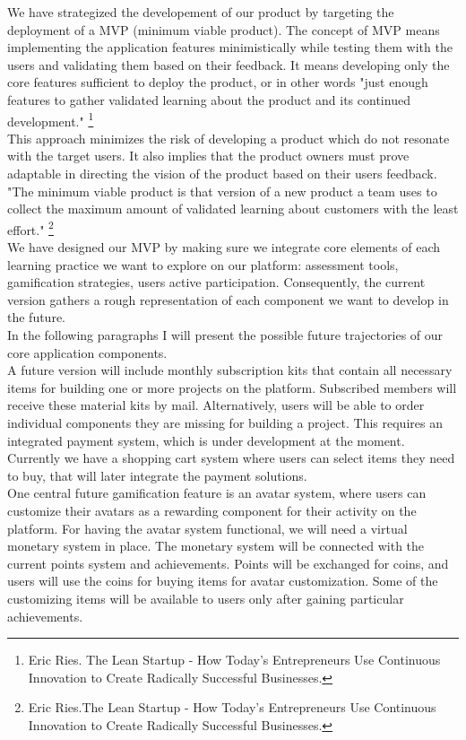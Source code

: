 We have strategized the developement of our product by targeting the deployment of a MVP (minimum viable product). The concept of MVP means implementing the application features minimistically while testing them with the users and validating them based on their feedback. It means developing only the core features sufficient to deploy the product, or in other words "just enough features to gather validated learning about the product and its continued development." \cite{leanstartup}\footnote{Eric Ries. The Lean Startup - How Today's Entrepreneurs Use Continuous Innovation to Create Radically Successful Businesses.} \\

This approach minimizes the risk of developing a product which do not resonate with the target users. It also implies that the product owners must prove adaptable in directing the vision of the product based on their users feedback. "The minimum viable product is that version of a new product a team uses to collect the maximum amount of validated learning about customers with the least effort." \footnote{Eric Ries.The Lean Startup - How Today's Entrepreneurs Use Continuous Innovation to Create Radically Successful Businesses.} \\

We have designed our MVP by making sure we integrate core elements of each learning practice we want to explore on our platform: assessment tools, gamification strategies, users active participation.
Consequently, the current version gathers a rough representation of each component we want to develop in the future. \\

In the following paragraphs I will present the possible future trajectories of our core application components. \\

A future version will include monthly subscription kits that contain all necessary items for building one or more projects on the platform. Subscribed members will receive these material kits by mail. Alternatively, users will be able to order individual components they are missing for building a project. This requires an integrated payment system, which is under development at the moment. Currently we have a shopping cart system where users can select items they need to buy, that will later integrate the payment solutions. \\

One central future gamification feature is an avatar system, where users can customize their avatars as a rewarding component for their activity on the platform. For having the avatar system functional, we will need a virtual monetary system in place. The monetary system will be connected with the current points system and achievements. Points will be exchanged for coins, and users will use the coins for buying items for avatar customization. Some of the customizing items will be available to users only after gaining particular achievements. \\

